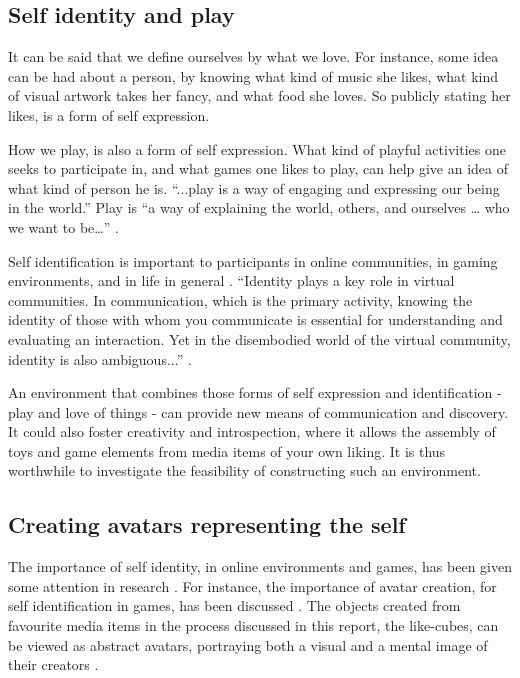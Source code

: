 \documentclass[]{article}
\begin{document}
\subsection{Self identity and play}

It can be said that we define ourselves by what we love.  For instance, some idea can be had about a person, by knowing what kind of music she likes, what kind of visual artwork takes her fancy, and what food she loves.  So publicly stating her likes, is a form of self expression.

How we play, is also a form of self expression.  What kind of playful activities one seeks to participate in, and what games one likes to play, can help give an idea of what kind of person he is.  “...play is a way of engaging and expressing our being in the world.”  Play is “a way of explaining the world, others, and ourselves … who we want to be…” \cite{sicart2014play}.

Self identification is important to participants in online communities, in gaming environments, and in life in general \cite{marwick2005selling}.  “Identity plays a key role in virtual communities. In communication, which is the primary activity, knowing the identity of those with whom you communicate is essential for understanding and evaluating an interaction.  Yet in the disembodied world of the virtual community, identity is also ambiguous...” \cite{kollock2002communities}.

An environment that combines those forms of self expression and identification - play and love of things - can provide new means of communication and discovery.  It could also foster creativity and introspection, where it allows the assembly of toys and game elements from media items of your own liking.  It is thus worthwhile to investigate the feasibility of constructing such an environment.


\subsection{Creating avatars representing the self}

The importance of self identity, in online environments and games, has been given some attention in research \cite{jones1997virtual}\cite{zhao2008identity}\cite{slater2002social}\cite{kollock2002communities}\cite{marwick2005selling}\cite{vitak2008facebook}.  For instance, the importance of avatar creation, for self identification in games, has been discussed \cite{waggoner2009my}\cite{trepte2010avatar}.  The objects created from favourite media items in the process discussed in this report, the like-cubes, can be viewed as abstract avatars, portraying both a visual and a mental image of their creators \cite{trepte2010avatar}.
\end{document}
